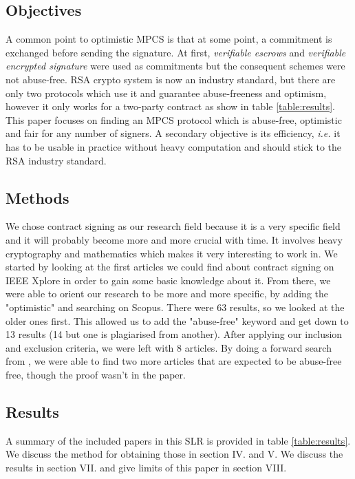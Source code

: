 \subsection{Objectives}
A common point to optimistic MPCS is that at some point, a commitment is exchanged before sending the signature. At first, \textit{verifiable escrows} \cite{asokan} and \textit{verifiable encrypted signature} \cite{ves} were used as commitments but the consequent schemes were not abuse-free.
RSA crypto system is now an industry standard, but there are only two protocols which use it and guarantee abuse-freeness and optimism, however it only works for a two-party contract as show in table \ref{table:results}.
This paper focuses on finding an MPCS protocol which is abuse-free, optimistic and fair for any number of signers. A secondary objective is its efficiency, \textit{i.e.} it has to be usable in practice without heavy computation and should stick to the RSA industry standard.

\subsection{Methods}
We chose contract signing as our research field because it is a very specific field and it will probably become more and more crucial with time. It involves heavy cryptography and mathematics which makes it very interesting to work in.
We started by looking at the first articles we could find about contract signing on IEEE Xplore in order to gain some basic knowledge about it. From there, we were able to orient our research to be more and more specific, by adding the "optimistic" and searching on Scopus. There were 63 results, so we looked at the older ones first. This allowed us to add the "abuse-free" keyword and get down to 13 results (14 but one is plagiarised from another). After applying our inclusion and exclusion criteria, we were left with 8 articles. By doing a forward search from \cite{Promise}, we were able to find two more articles that are expected to be abuse-free free, though the proof wasn't in the paper.

\subsection{Results}
A summary of the included papers in this SLR is provided in table \ref{table:results}. We discuss the method for obtaining those in section IV. and V. We discuss the results in section VII. and give limits of this paper in section VIII.

